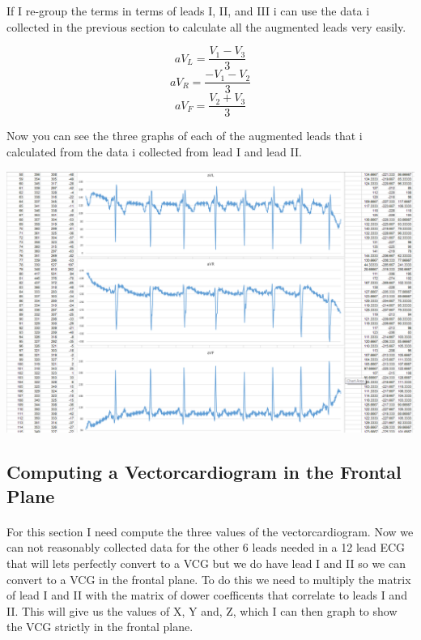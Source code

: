\documentclass[12pt]{article}
\begin{document}
				If I re-group the terms in terms of leads I, II, and III i can use the data i collected in the previous section to calculate all the augmented leads 
				very easily.

				\begin{equation}
					aV_L = \frac{V_1-V_3}{3}
				\end{equation}
				\begin{equation}
					aV_R = \frac{-V_1-V_2}{3}
				\end{equation}
				\begin{equation}
					aV_F = \frac{V_2+V_3}{3}
				\end{equation}

				Now you can see the three graphs of each of the augmented leads that i calculated from the data i collected from lead I and lead II.

				\begin{center}
					\includegraphics[scale=0.28]{augmented.PNG}\\
				\end{center}

		\subsection{Computing a Vectorcardiogram in the Frontal Plane}
			\paragraph{}
				For this section I need compute the three values of the vectorcardiogram. Now we can not reasonably collected data for the other 6 
				leads needed in a 12 lead ECG that will lets perfectly convert to a VCG but we do have lead I and II so we can convert to a VCG in the 
				frontal plane.  To do this we need to multiply the matrix of lead I and II with the matrix of dower coefficents that correlate to leads I and
				II. This will give us the values of X, Y and, Z, which I can then graph to show the VCG strictly in the frontal plane. 
\end{document}

